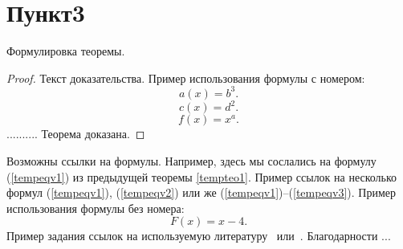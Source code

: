 \documentclass[10pt,twoside]{uz_kgu}
\begin{document}
\section{Пункт3}
\begin{Theorem} \label{tempteo1} Формулировка теоремы.
\end{Theorem}
\begin{proof}
Текст доказательства. Пример использования формулы с номером:
\begin{equation} \label{tempeqv1}
		a(x)=b^3.
\end{equation}
\begin{equation} \label{tempeqv2}
		c(x)=d^2.
\end{equation}
\begin{equation} \label{tempeqv3}
		f(x)=x^a.
\end{equation}
..........
Теорема доказана.
\end{proof}
Возможны ссылки на формулы. Например, здесь мы сослались на формулу (\ref{tempeqv1}) из предыдущей теоремы \ref{tempteo1}. Пример ссылок на несколько формул (\ref{tempeqv1}), (\ref{tempeqv2}) или же (\ref{tempeqv1})--(\ref{tempeqv3}).
Пример использования формулы без номера:
	$$F(x)=x-4.$$
Пример задания ссылок на используемую литературу~\cite{tempbib1, tempbib3} или~\cite{tempbib2}.
\vspace{\baselineskip} Благодарности ...
\end{document}
